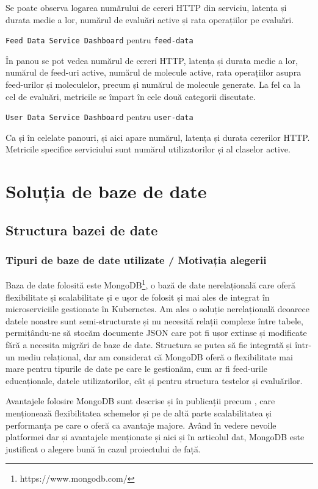   Se poate observa logarea numărului de cereri HTTP din serviciu, latența și durata medie a lor, numărul de evaluări
  active și rata operațiilor pe evaluări.

  \texttt{Feed Data Service Dashboard} pentru \texttt{feed-data}
  
  În panou se pot vedea numărul de cereri HTTP, latența și durata medie a lor, numărul de feed-uri active, numărul de molecule
  active, rata operațiilor asupra feed-urilor și moleculelor, precum și numărul de molecule generate. La fel
  ca la cel de evaluări, metricile se împart în cele două categorii discutate.

  \texttt{User Data Service Dashboard} pentru \texttt{user-data}

  Ca și în celelate panouri, și aici apare numărul, latența și durata cererilor HTTP. Metricile specifice serviciului
  sunt numărul utilizatorilor și al claselor active.
\section{Soluția de baze de date}
\label{sec:proj-database}

\subsection{Structura bazei de date}

\subsubsection{Tipuri de baze de date utilizate / Motivația alegerii}

Baza de date folosită este MongoDB\footnote{https://www.mongodb.com/}, o bază de date nerelațională care oferă flexibilitate și scalabilitate
și e ușor de folosit și mai ales de integrat în microserviciile gestionate în Kubernetes. Am ales o soluție
nerelațională deoarece datele noastre sunt semi-structurate și nu necesită relații complexe între tabele,
permițându-ne să stocăm documente JSON care pot fi ușor extinse și modificate fără a necesita migrări
de baze de date. Structura se putea să fie integrată și într-un mediu relațional, dar am considerat că
MongoDB oferă o flexibilitate mai mare pentru tipurile de date pe care le gestionăm, cum ar fi feed-urile 
educaționale, datele utilizatorilor, cât și pentru structura testelor și evaluărilor.

Avantajele folosire MongoDB sunt descrise și în publicații precum \cite{mongoDevTo}, care menționează
flexibilitatea schemelor și pe de altă parte scalabilitatea și performanța pe care o oferă ca avantaje majore. 
Având în vedere nevoile platformei dar și avantajele menționate și aici și în articolul dat,
MongoDB este justificat o alegere bună în cazul proiectului de față.

